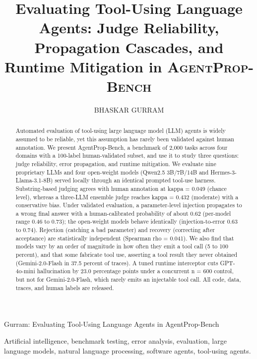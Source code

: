 \documentclass{ieeeaccess}
\newcommand{\bench}{\textsc{AgentProp-Bench}\xspace}
\begin{document}

\title{Evaluating Tool-Using Language Agents: Judge Reliability, Propagation
Cascades, and Runtime Mitigation in \bench{}}
\author{\uppercase{Bhaskar Gurram}}
\address[1]{Zasti Inc., Ashburn, VA 20147 USA (e-mail: gurrambhaskar.ai@gmail.com)}
{Gurram: Evaluating Tool-Using Language Agents in AgentProp-Bench}

\begin{abstract}
Automated evaluation of tool-using large language model (LLM) agents is widely
assumed to be reliable, yet this assumption has rarely been validated against
human annotation. We present AgentProp-Bench, a benchmark of 2,000 tasks across
four domains with a 100-label human-validated subset, and use it to study three
questions: judge reliability, error propagation, and runtime mitigation. We
evaluate nine proprietary LLMs and four open-weight models (Qwen2.5 3B/7B/14B
and Hermes-3-Llama-3.1-8B) served locally through an identical prompted tool-use
harness.
Substring-based judging agrees with human annotation at kappa = 0.049
(chance level), whereas a three-LLM ensemble judge reaches kappa = 0.432
(moderate) with a conservative bias. Under validated evaluation, a
parameter-level injection propagates to a wrong final answer with a
human-calibrated probability of about 0.62 (per-model range 0.46 to 0.73); the
open-weight models behave identically (injection-to-error 0.63 to 0.74).
Rejection (catching a bad parameter) and recovery (correcting after acceptance)
are statistically independent (Spearman rho = 0.041). We also find that models
vary by an order of magnitude in how often they emit a tool call (5 to 100
percent), and that some fabricate tool use, asserting a tool result they never
obtained (Gemini-2.0-Flash in 37.5 percent of traces). A tuned runtime
interceptor cuts GPT-4o-mini hallucination by 23.0 percentage points under a
concurrent n = 600 control, but not for Gemini-2.0-Flash, which rarely emits an
injectable tool call. All code, data, traces, and human labels are released.
\end{abstract}

\begin{keywords}
Artificial intelligence, benchmark testing, error analysis, evaluation,
large language models, natural language processing, software agents,
tool-using agents.
\end{keywords}
\end{document}
